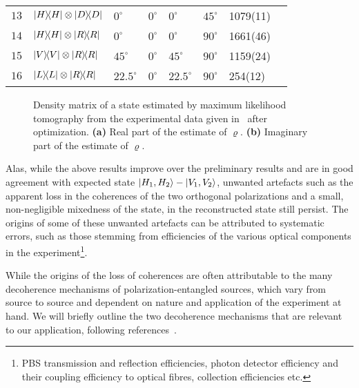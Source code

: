 \begin{table}[t!]
\begin{tabular}{llllllll}
		$13$ & $\op{H}\otimes\op{D}$ & $0^{\circ}$    & $0^{\circ}$  & $0^{\circ}$     & $45^{\circ}$  & 1079(11) \\
		$14$ & $\op{H}\otimes\op{R}$ & $0^{\circ}$    & $0^{\circ}$  & $0^{\circ}$     & $90^{\circ}$  & 1661(46) \\
		$15$ & $\op{V}\otimes\op{R}$ & $45^{\circ}$   & $0^{\circ}$  & $45^{\circ}$    & $90^{\circ}$  & 1159(24) \\
		$16$ & $\op{L}\otimes\op{R}$ & $22.5^{\circ}$ & $0^{\circ}$  & $22.5^{\circ}$  & $90^{\circ}$  & 254(12) \\
		\toprule
	\end{tabular}
\end{table}

\begin{figure}[t!]
    \centering
\caption[Density matrix of a state estimated by maximum likelihood tomography from experimental data after optimization.]{Density matrix of a state estimated by maximum likelihood tomography from the experimental data given in~\protect{} after optimization. \textbf{(a)} Real part of the estimate of $\varrho$. \textbf{(b)} Imaginary part of the estimate of $\varrho$.}
\end{figure}

\noindent
Alas, while the above results improve over the preliminary results and are in good agreement with expected state $\ket{H_1,H_2} - \ket{V_1,V_2}$, unwanted artefacts such as the apparent loss in the coherences of the two orthogonal polarizations and a small, non-negligible mixedness of the state, in the reconstructed state still persist. The origins of some of these unwanted artefacts can be attributed to systematic errors, such as those stemming from efficiencies of the various optical components in the experiment\footnote[][-30pt]{PBS transmission and reflection efficiencies, photon detector efficiency and their coupling efficiency to optical fibres, collection efficiencies etc.}. 

\bigskip
\noindent
While the origins of the loss of coherences are often attributable to the many decoherence mechanisms of polarization-entangled sources, which vary from source to source and dependent on nature and application of the experiment at hand. We will briefly outline the two decoherence mechanisms that are relevant to our application, following references~\cite{Akselrod_2007, Akselrod_err_2007, Baek_2008, Rangarajan_2009}.

